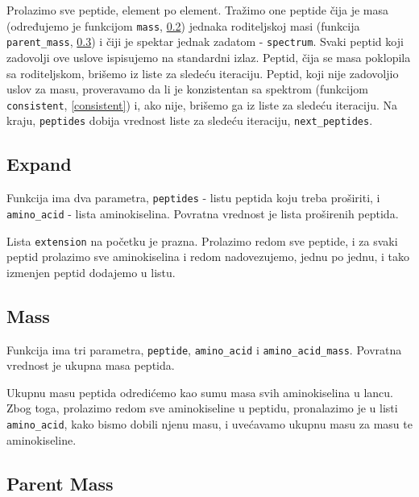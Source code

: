 Prolazimo sve peptide, element po element. Tražimo one peptide čija je masa (određujemo je funkcijom \texttt{mass}, \ref{mass}) jednaka roditeljskoj masi (funkcija \texttt{parent\_mass}, \ref{parentMass}) i čiji je spektar jednak zadatom - \texttt{spectrum}. Svaki peptid koji zadovolji ove uslove ispisujemo na standardni izlaz. Peptid, čija se masa poklopila sa roditeljskom, brišemo iz liste za sledeću iteraciju. Peptid, koji nije zadovoljio uslov za masu, proveravamo da li je konzistentan sa spektrom (funkcijom \texttt{consistent}, \ref{consistent}) i, ako nije, brišemo ga iz liste za sledeću iteraciju. Na kraju, \texttt{peptides} dobija vrednost liste za sledeću iteraciju, \texttt{next\_peptides}.




\subsection{Expand}
\label{expand}

Funkcija ima dva parametra, \texttt{peptides} - listu peptida koju treba proširiti, i \texttt{amino\_acid} - lista aminokiselina. Povratna vrednost je lista proširenih peptida.

Lista \texttt{extension} na početku je prazna. Prolazimo redom sve peptide, i za svaki peptid prolazimo sve aminokiselina i redom nadovezujemo, jednu po jednu, i tako izmenjen peptid dodajemo u listu.





\subsection{Mass}
\label{mass}

Funkcija ima tri parametra, \texttt{peptide}, \texttt{amino\_acid} i \texttt{amino\_acid\_mass}. Povratna vrednost je ukupna masa peptida.

Ukupnu masu peptida odredićemo kao sumu masa svih aminokiselina u lancu. Zbog toga, prolazimo redom sve aminokiseline u peptidu, pronalazimo je u listi \texttt{amino\_acid}, kako bismo dobili njenu masu, i uvećavamo ukupnu masu za masu te aminokiseline. 




\subsection{Parent Mass}
\label{parentMass}

